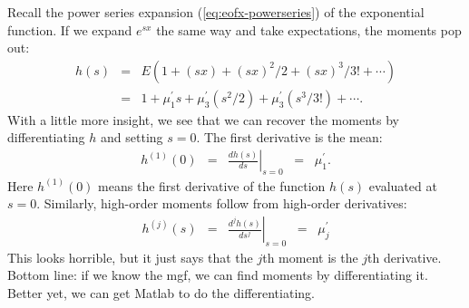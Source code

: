 \documentclass[11pt]{article}
\begin{document}
Recall the power series expansion (\ref{eq:eofx-powerseries}) of the exponential function.
If we expand $e^{sx}$ the same way and take expectations,
the moments pop out:
\begin{eqnarray*}
    h(s) &=& E \left( 1 + (sx) + (sx)^2/2 + (sx)^3/3! + \cdots \right) \\
            &=&  1 + \mu_1^\prime s + \mu_3^\prime (s^2/2)  + \mu_3^\prime (s^3/3!)  + \cdots .
\end{eqnarray*}
With a little more insight, we see that we can recover the moments by differentiating
$h$ and setting $s=0$.
The first derivative is the mean:
\begin{eqnarray*}
    h^{(1)} (0)  &=& \left. \frac{ d h(s)}{d s} \right|_{s=0}
            \;\;=\;\;  \mu_1^\prime .
\end{eqnarray*}
Here $h^{(1)}(0)$ means the first derivative of the function $h(s)$ evaluated at
$s=0$.
Similarly, high-order moments follow from high-order derivatives:
\begin{eqnarray*}
    h^{(j)} (s)  &=& \left. \frac{d^j h(s)}{d s^j} \right|_{s=0}
            \;\;=\;\;  \mu_j^\prime
\end{eqnarray*}
This looks horrible, but it just says that the $j$th moment is the $j$th derivative.
Bottom line:  if we know the mgf, we can find moments by differentiating it.
Better yet, we can get Matlab to do the differentiating.
\end{document}
